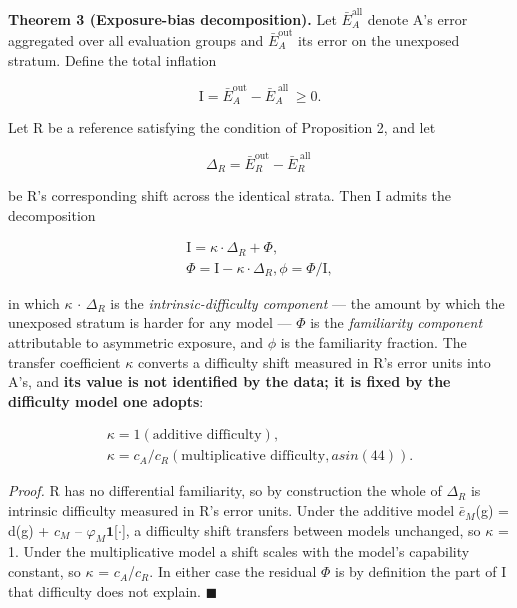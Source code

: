 \textbf{Theorem 3 (Exposure-bias decomposition).} Let $\bar{E}_{A}^{\mathrm{all}}$ denote A's error aggregated over all evaluation groups and $\bar{E}_{A}^{\mathrm{out}}$ its error on the unexposed stratum. Define the total inflation

\begin{equation}
\label{eq:56}
\mathrm{I} = \bar{E}_A^{\mathrm{out}} - \bar{E}_A^{\;\text{all}\;} \geq 0.
\end{equation}

Let R be a reference satisfying the condition of Proposition 2, and let

\begin{equation}
\label{eq:57}
\Delta _R = \bar{E}_R^{\mathrm{out}} - \bar{E}_R^{\;\text{all}\;}
\end{equation}

be R's corresponding shift across the identical strata. Then $\mathrm{I}$ admits the decomposition

\begin{equation}
\label{eq:58}
\begin{aligned}
\mathrm{I} = \kappa \cdot \Delta _R + \Phi , \\
\Phi = \mathrm{I} - \kappa \cdot \Delta _R, \phi = \Phi / \mathrm{I} ,
\end{aligned}
\end{equation}

in which $\kappa$ $\cdot$ $\Delta_{R}$ is the \emph{intrinsic-difficulty component} --- the amount by which the unexposed stratum is harder for any model --- $\Phi$ is the \emph{familiarity component} attributable to asymmetric exposure, and $\phi$ is the familiarity fraction. The transfer coefficient $\kappa$ converts a difficulty shift measured in R's error units into A's, and \textbf{its value is not identified by the data; it is fixed by the difficulty model one adopts}:

\begin{equation}
\label{eq:59}
\begin{aligned}
\kappa = 1 (\text{additive difficulty}), \\
\kappa = c_A / c_R (\text{multiplicative difficulty}, as in (44)).
\end{aligned}
\end{equation}

\emph{Proof.} R has no differential familiarity, so by construction the whole of $\Delta_{R}$ is intrinsic difficulty measured in R's error units. Under the additive model $\bar{e}_{M}$(g) = d(g) + $c_{M}$ -- $\varphi_{M}\mathbf{1}$[$\cdot$], a difficulty shift transfers between models unchanged, so $\kappa$ = 1. Under the multiplicative model  a shift scales with the model's capability constant, so $\kappa$ = $c_{A}$/$c_{R}$. In either case the residual $\Phi$ is by definition the part of $\mathrm{I}$ that difficulty does not explain. $\blacksquare$

